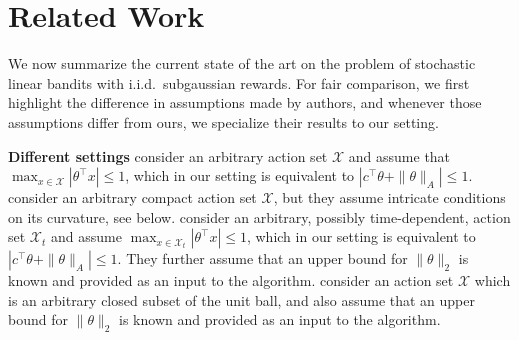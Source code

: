 \section{Related Work}
\label{ssec:Related Work}

We now summarize the current state of the art on the problem of stochastic linear
bandits with i.i.d.\ subgaussian rewards.
For fair comparison, we first highlight the difference in assumptions made by
authors, and whenever those assumptions differ from ours, we specialize their results
to our setting.

\textbf{Different settings} \cite{dani_stochastic_2008} consider an arbitrary action set $\mathcal{X}$ and assume that $\max_{x \in \mathcal{X}} |\theta^\top x| \le 1$, which in our setting is equivalent to $|c^\top \theta + \|\theta\|_{A}| \le 1$. 
\cite{rusmi_linearly_2010} consider an arbitrary compact action set $\mathcal{X}$, but they assume intricate conditions on its curvature, see below. 
\cite{abbasi2011improved} consider an arbitrary, possibly time-dependent, action set $\mathcal{X}_t$ and assume $\max_{x \in \mathcal{X}_t} |\theta^\top x | \le 1$, which in our setting is equivalent to $|c^\top \theta + \|\theta\|_{A}| \le 1$. 
They further assume that an upper bound for $\|\theta\|_{2}$ is known and provided as an input to the algorithm. 
\cite{abeille_2017} consider an action set $\mathcal{X}$ which is an arbitrary closed subset of the unit ball, and also assume that an upper bound for $\|\theta\|_{2}$ is known and provided as an input to the algorithm. 

